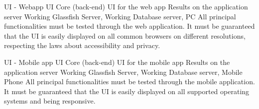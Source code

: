 \testx
{UI - Webapp}
{UI}
{Core (back-end)}
{UI for the web app}
{Results on the application server}
{Working Glassfish Server, Working Database server, PC}
{All principal functionalities must be tested through the web application. It must be guaranteed that the UI is easily displayed on all common browsers on different resolutions, respecting the laws about accessibility and privacy.}

\testx
{UI - Mobile app}
{UI}
{Core (back-end)}
{UI for the mobile app}
{Results on the application server}
{Working Glassfish Server, Working Database server, Mobile Phone}
{All principal functionalities must be tested through the mobile application. It must be guaranteed that the UI is easily displayed on all supported operating systems and being responsive.}